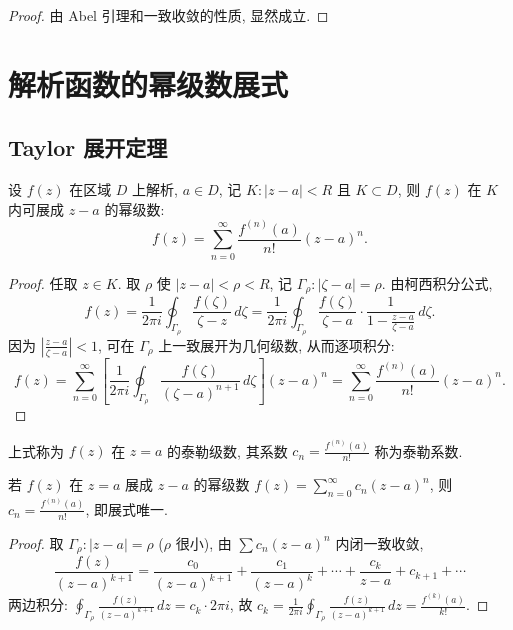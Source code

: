 \documentclass[theorem=false,mathfont=none,openany,sub3section]{easybook}
\begin{document}
\begin{proof}
  由 Abel 引理和一致收敛的性质, 显然成立.
\end{proof}

\newpage

\section{解析函数的幂级数展式}

\subsection{Taylor 展开定理}

\begin{theorem}
  设 $f(z)$ 在区域 $D$ 上解析, $a\in D$, 记 $K:|z-a|<R$ 且 $K\subset D$, 则 $f(z)$ 在 $K$ 内可展成 $z-a$ 的幂级数:
  \[
  f(z)=\sum_{n=0}^{\infty}\frac{f^{(n)}(a)}{n!}(z-a)^{n}.
  \]
\end{theorem}

\begin{proof}
  任取 $z\in K$. 取 $\rho$ 使 $|z-a|<\rho<R$, 记 $\Gamma_{\rho}:|\zeta-a|=\rho$. 由柯西积分公式,
  \[
  f(z)=\frac{1}{2\pi i}\oint_{\Gamma_{\rho}}\frac{f(\zeta)}{\zeta-z}\,d\zeta
  =\frac{1}{2\pi i}\oint_{\Gamma_{\rho}}\frac{f(\zeta)}{\zeta-a}\cdot
  \frac{1}{1-\frac{z-a}{\zeta-a}}\,d\zeta.
  \]
  因为 $\left|\frac{z-a}{\zeta-a}\right|<1$, 可在 $\Gamma_{\rho}$ 上一致展开为几何级数, 从而逐项积分:
  \[
  f(z)=\sum_{n=0}^{\infty}
  \left[\frac{1}{2\pi i}\oint_{\Gamma_{\rho}}\frac{f(\zeta)}{(\zeta-a)^{n+1}}\,d\zeta\right](z-a)^{n}
  =\sum_{n=0}^{\infty}\frac{f^{(n)}(a)}{n!}(z-a)^{n}.
  \]
\end{proof}

\begin{definition}
  上式称为 $f(z)$ 在 $z=a$ 的泰勒级数, 其系数 $c_{n}=\frac{f^{(n)}(a)}{n!}$ 称为泰勒系数.
\end{definition}

\begin{corollary}[展式唯一性]
  若 $f(z)$ 在 $z=a$ 展成 $z-a$ 的幂级数 $f(z)=\sum_{n=0}^{\infty}c_{n}(z-a)^{n}$, 则 $c_{n}=\frac{f^{(n)}(a)}{n!}$, 即展式唯一.
\end{corollary}

\begin{proof}
  取 $\Gamma_{\rho}:|z-a|=\rho$ ($\rho$ 很小), 由 $\sum c_{n}(z-a)^{n}$ 内闭一致收敛,
  \[
  \frac{f(z)}{(z-a)^{k+1}}=\frac{c_{0}}{(z-a)^{k+1}}+\frac{c_{1}}{(z-a)^{k}}+\cdots+\frac{c_{k}}{z-a}+c_{k+1}+\cdots
  \]
  两边积分: $\oint_{\Gamma_{\rho}}\frac{f(z)}{(z-a)^{k+1}}\,dz=c_{k}\cdot2\pi i$, 故 $c_{k}=\frac{1}{2\pi i}\oint_{\Gamma_{\rho}}\frac{f(z)}{(z-a)^{k+1}}\,dz=\frac{f^{(k)}(a)}{k!}$.
\end{proof}
\end{document}
